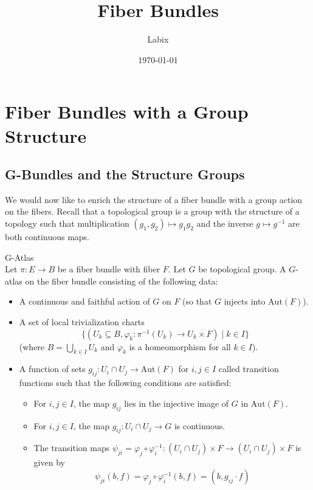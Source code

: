 \documentclass[a4paper]{article}
\title{Fiber Bundles}
\author{Labix}
\date{\today}
\begin{document}
\maketitle
\pagebreak
\tableofcontents

\pagebreak
\section{Fiber Bundles with a Group Structure}
\subsection{G-Bundles and the Structure Groups}
We would now like to enrich the structure of a fiber bundle with a group action on the fibers. Recall that a topological group is a group with the structure of a topology such that multiplication $(g_1,g_2)\mapsto g_1g_2$ and the inverse $g\mapsto g^{-1}$ are both continuous maps. 

\begin{defn}{G-Atlas}{}\\
Let $\pi:E\to B$ be a fiber bundle with fiber $F$. Let $G$ be topological group. A $G$-atlas on the fiber bundle consisting of the following data: 
\begin{itemize}
\item A continuous and faithful action of $G$ on $F$ (so that $G$ injects into $\text{Aut}(F)$). 
\item A set of local trivialization charts $$\{(U_k\subseteq B,\varphi_k:\pi^{-1}(U_k)\to U_k\times F)\;|\;k\in I\}$$ (where $B=\bigcup_{k\in I}U_k$ and $\varphi_k$ is a homeomorphism for all $k\in I$). 
\item A function of sets $g_{ij}:U_i\cap U_j\to\text{Aut}(F)$ for $i,j\in I$ called transition functions such that the following conditions are satisfied: 
\begin{itemize}
\item For $i,j\in I$, the map $g_{ij}$ lies in the injective image of $G$ in $\text{Aut}(F)$. 
\item For $i,j\in I$, the map $g_{ij}:U_i\cap U_j\to G$ is continuous. 
\item The transition maps $\psi_{ji}=\varphi_j\circ\varphi_i^{-1}:(U_i\cap U_j)\times F\to(U_i\cap U_j)\times F$ is given by $$\psi_{ji}(b,f)=\varphi_j\circ\varphi_i^{-1}(b,f)=(b,g_{ij}\cdot f)$$
\end{itemize}
\end{itemize}
\end{defn}
\end{document}
